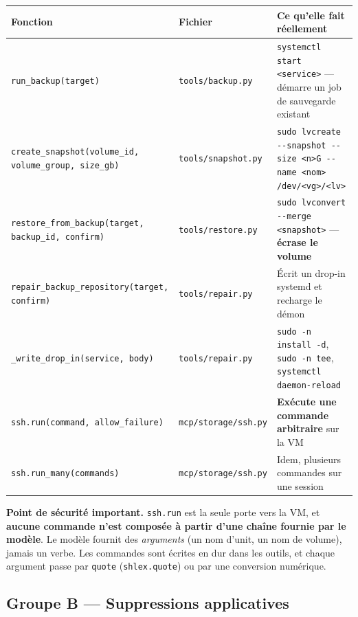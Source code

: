 \documentclass[11pt,a4paper]{report}
\newcommand{\file}[1]{\texttt{\small #1}}
\newcommand{\fn}[1]{\texttt{\small\textcolor{oasisviolet}{#1}}}
\begin{document}
\begin{longtable}{@{}p{3.6cm}p{3.5cm}p{7.3cm}@{}}
\toprule
\textbf{Fonction} & \textbf{Fichier} & \textbf{Ce qu'elle fait réellement}\\
\midrule
\endhead
\fn{run\_backup(target)} & \file{tools/backup.py} & \texttt{systemctl start <service>} --- démarre un job de sauvegarde existant\\
\fn{create\_snapshot(volume\_id, volume\_group, size\_gb)} & \file{tools/snapshot.py} & \texttt{sudo lvcreate -{}-snapshot -{}-size <n>G -{}-name <nom> /dev/<vg>/<lv>}\\
\fn{restore\_from\_backup(target, backup\_id, confirm)} & \file{tools/restore.py} & \texttt{sudo lvconvert -{}-merge <snapshot>} --- \textbf{écrase le volume}\\
\fn{repair\_backup\_repository(target, confirm)} & \file{tools/repair.py} & Écrit un drop-in systemd et recharge le démon\\
\fn{\_write\_drop\_in(service, body)} & \file{tools/repair.py} & \texttt{sudo -n install -d}, \texttt{sudo -n tee}, \texttt{systemctl daemon-reload}\\
\fn{ssh.run(command, allow\_failure)} & \file{mcp/storage/ssh.py} & \textbf{Exécute une commande arbitraire} sur la VM\\
\fn{ssh.run\_many(commands)} & \file{mcp/storage/ssh.py} & Idem, plusieurs commandes sur une session\\
\bottomrule
\end{longtable}

\begin{keybox}
\textbf{Point de sécurité important.} \fn{ssh.run} est la seule porte vers la
VM, et \textbf{aucune commande n'est composée à partir d'une chaîne fournie par
le modèle}. Le modèle fournit des \emph{arguments} (un nom d'unit, un nom de
volume), jamais un verbe. Les commandes sont écrites en dur dans les outils, et
chaque argument passe par \fn{quote} (\texttt{shlex.quote}) ou par une
conversion numérique.
\end{keybox}

\subsection{Groupe B --- Suppressions applicatives}
\end{document}
